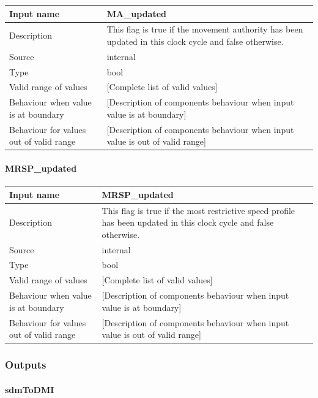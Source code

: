 \begin{longtable}{p{}p{}}
\toprule
Input name				& MA\_updated \\
\midrule
Description				& This flag is true if the movement authority has been updated in this clock cycle and false otherwise. \\
\midrule
Source					& internal \\ 
\midrule
Type					& bool \\
\midrule
Valid range of values	& [Complete list of valid values] \\
\midrule
Behaviour when value is at boundary	& [Description of components behaviour when input value is at boundary] \\
\midrule
Behaviour for values out of valid range	& [Description of components behaviour when input value is out of valid range] \\
\bottomrule
\end{longtable}


\paragraph{MRSP\_updated}

\begin{longtable}{p{}p{}}
\toprule
Input name				& MRSP\_updated \\
\midrule
Description				& This flag is true if the most restrictive speed profile has been updated in this clock cycle and false otherwise. \\
\midrule
Source					& internal \\ 
\midrule
Type					& bool \\
\midrule
Valid range of values	& [Complete list of valid values] \\
\midrule
Behaviour when value is at boundary	& [Description of components behaviour when input value is at boundary] \\
\midrule
Behaviour for values out of valid range	& [Description of components behaviour when input value is out of valid range] \\
\bottomrule
\end{longtable}


\subsubsection{Outputs}\label{s:trainsupervision_outputs}

\paragraph{sdmToDMI}


